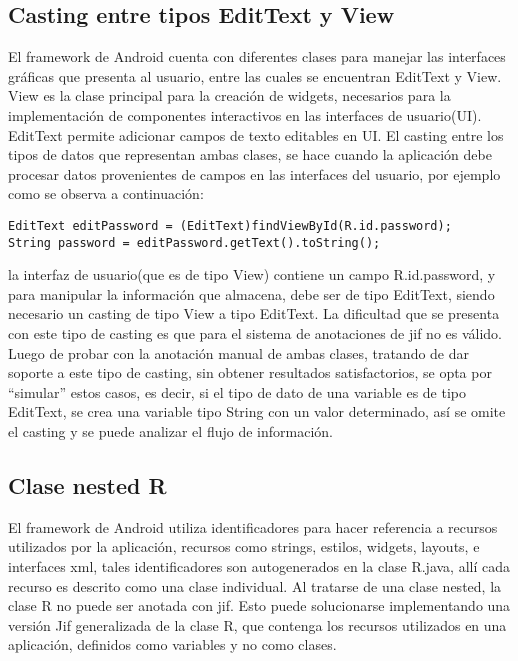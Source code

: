 \subsection{Casting entre tipos EditText y View}
\label{sec:casting}
El framework de Android cuenta con diferentes clases para manejar las interfaces
gráficas que presenta al usuario, entre las cuales se encuentran EditText y
View.\newline
View es la clase principal para la creación de widgets, necesarios para la
implementación de componentes interactivos en las interfaces de
usuario(UI).\newline 
EditText permite adicionar campos de texto editables en UI.\newline
El casting entre los tipos de datos que representan ambas clases, se hace cuando la aplicación debe
procesar datos provenientes de campos en las interfaces del usuario, por ejemplo
como se observa a continuación:
\begin{lstlisting}
EditText editPassword = (EditText)findViewById(R.id.password);
String password = editPassword.getText().toString();
\end{lstlisting}
la interfaz de usuario(que es de tipo View) contiene un campo R.id.password, y
para manipular la información que almacena, debe ser de tipo EditText, siendo
necesario un casting de tipo View a tipo EditText. La dificultad que se presenta
con este tipo de casting es que para el sistema de anotaciones de jif no es
válido. Luego de probar con la anotación manual de ambas clases, tratando de
dar soporte a este tipo de casting, sin obtener resultados satisfactorios, se
opta por ``simular'' estos casos, es decir, si el tipo de dato de una variable
es de tipo EditText, se crea una variable tipo String con un valor determinado,
así se omite el casting y se puede analizar el flujo de información.

\subsection{Clase nested R}
\label{sec:nested}
El framework de Android utiliza identificadores para hacer referencia a recursos
utilizados por la aplicación, recursos como strings, estilos, widgets, layouts, e
interfaces xml, tales identificadores son autogenerados en la clase R.java, allí
cada recurso es descrito como una clase individual. Al tratarse de una clase
nested, la clase R no puede ser anotada con jif. Esto puede solucionarse
implementando una versión Jif generalizada de la clase R, que contenga los
recursos utilizados en una aplicación, definidos como variables y no como clases.

